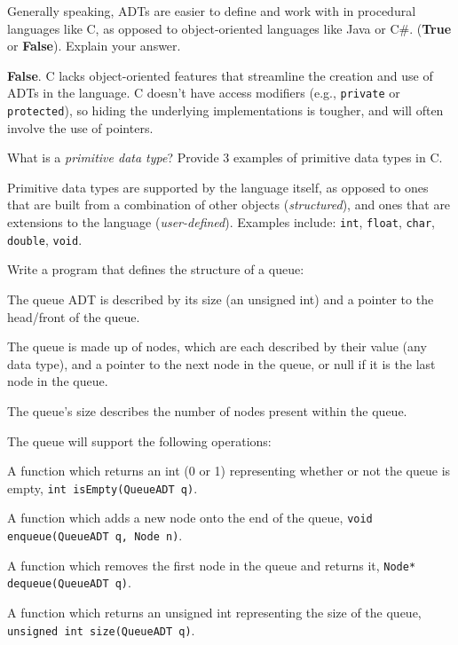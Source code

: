 
Generally speaking, ADTs are easier to define and work with in procedural languages like C, as opposed to object-oriented languages like Java or C\#. (\textbf{True} or \textbf{False}). Explain your answer.

\begin{answer} 
\textbf{False}. C lacks object-oriented features that streamline the creation and use of ADTs in the language. C doesn't have access modifiers (e.g., \texttt{private} or \texttt{protected}), so hiding the underlying implementations is tougher, and will often involve the use of pointers.
\end{answer}

\item What is a \emph{primitive data type}? Provide 3 examples of primitive data types in C.

\begin{answer}
Primitive data types are supported by the language itself, as opposed to ones that are built from a combination of other objects (\emph{structured}), and ones that are extensions to the language (\emph{user-defined}). Examples include: \texttt{int}, \texttt{float}, \texttt{char}, \texttt{double}, \texttt{void}.
\end{answer}

\item Write a program that defines the structure of a queue:
\begin{itemize} {\small
	\item The queue ADT is described by its size (an unsigned int) and a pointer to the head/front of the queue.
	\item The queue is made up of nodes, which are each described by their value (any data type), and a pointer to the next node in the queue, or null if it is the last node in the queue.
	\item The queue's size describes the number of nodes present within the queue.
	\item The queue will support the following operations:}
	\begin{itemize} {\scriptsize
		\item A function which returns an int (0 or 1) representing whether or not the queue is empty, \texttt{int isEmpty(QueueADT q)}.
		\item A function which adds a new node onto the end of the queue, \texttt{void enqueue(QueueADT q, Node n)}.
		\item A function which removes the first node in the queue and returns it, \texttt{Node* dequeue(QueueADT q)}.
		\item A function which returns an unsigned int representing the size of the queue, \texttt{unsigned int size(QueueADT q)}.}
	\end{itemize}
\end{itemize}

\begin{answer}
	
\end{answer}


